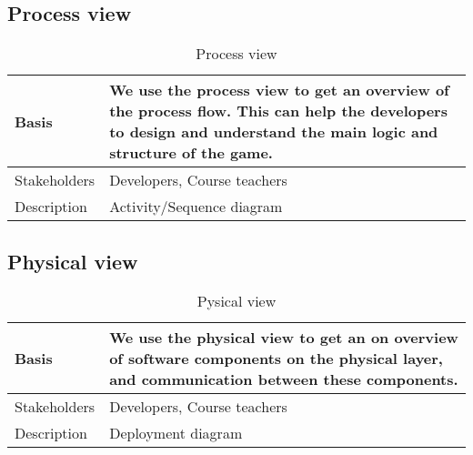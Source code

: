 \vspace{-20pt}

\subsection{Process view}

\begin{table}[h!]
\begin{tabular}{ | p{90pt} | p{270pt}  |}
\hline
Basis	 & We use the process view to get an overview of the process flow. This can help the developers to design and understand the main logic and structure of the game. \\ \hline
Stakeholders & Developers, Course teachers\\ \hline 
Description & Activity/Sequence diagram \\ \hline


\end{tabular}

\caption{Process view}

\end{table}

\vspace{-20pt}

\pagebreak
\subsection{Physical view}

\begin{table}[h!]
\begin{tabular}{ | p{90pt} | p{270pt}  |}
\hline
Basis	 & We use the physical view to get an on overview of software components on the physical layer, and communication between these components.  \\ \hline
Stakeholders & Developers, Course teachers\\ \hline 
Description & Deployment diagram \\ \hline


\end{tabular}

\caption{Pysical view}

\end{table}

\vspace{-20pt}







